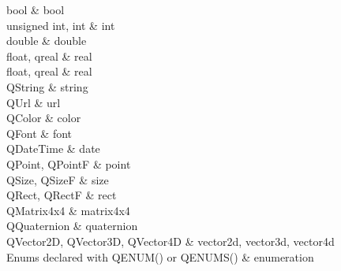﻿




bool
    &
bool
    \\

unsigned int, int
    &
int
    \\

double
    &
double
    \\

float, qreal
    &
real
    \\

float, qreal
    &
real
    \\

QString
    &
string
    \\

QUrl
    &
url
    \\

QColor
    &
color
    \\

QFont
    &
font
    \\

QDateTime
    &
date
    \\

QPoint, QPointF
    &
point
    \\

QSize, QSizeF
    &
size
    \\

QRect, QRectF
    &
rect
    \\

QMatrix4x4
    &
matrix4x4
    \\

QQuaternion
    &
quaternion
    \\

QVector2D, QVector3D, QVector4D
    &
vector2d, vector3d, vector4d
    \\

Enums declared with Q\underline{\hspace{0.5em}}ENUM() or Q\underline{\hspace{0.5em}}ENUMS()
    &
enumeration
    \\












